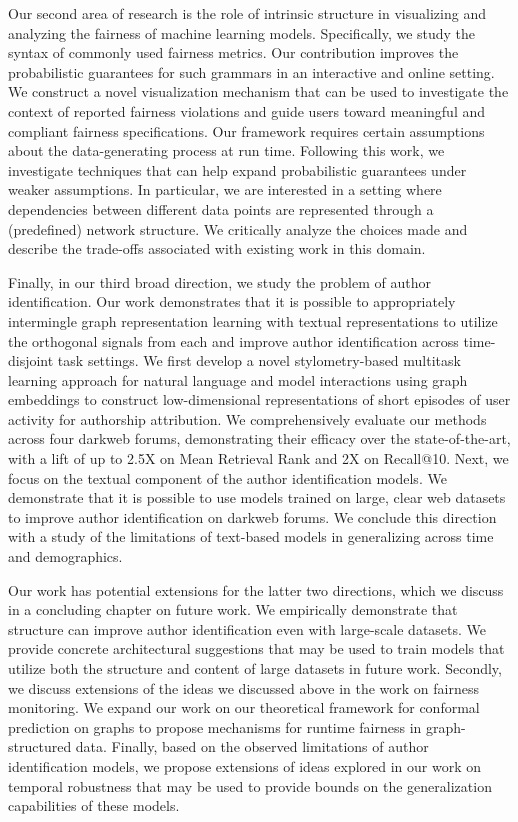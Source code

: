 Our second area of research is the role of intrinsic structure in visualizing and analyzing the fairness of machine learning models.
Specifically, we study the syntax of commonly used fairness metrics.
Our contribution improves the probabilistic guarantees for such grammars in an interactive and online setting.
We construct a novel visualization mechanism that can be used to investigate the context of reported fairness violations and guide users toward meaningful and compliant fairness specifications.
Our framework requires certain assumptions about the data-generating process at run time.
Following this work, we investigate techniques that can help expand probabilistic guarantees under weaker assumptions.
In particular, we are interested in a setting where dependencies between different data points are represented through a (predefined) network structure. We critically analyze the choices made and describe the trade-offs associated with existing work in this domain.

Finally, in our third broad direction, we study the problem of author identification.
Our work demonstrates that it is possible to appropriately intermingle graph representation learning with textual representations to utilize the orthogonal signals from each and improve author identification across time-disjoint task settings.
We first develop a novel stylometry-based multitask learning approach for natural language and model interactions using graph embeddings to construct low-dimensional representations of short episodes of user activity for authorship attribution. 
We comprehensively evaluate our methods across four darkweb forums, demonstrating their efficacy over the state-of-the-art, with a lift of up to 2.5X on Mean Retrieval Rank and 2X on Recall@10.
Next, we focus on the textual component of the author identification models.
We demonstrate that it is possible to use models trained on large, clear web datasets to improve author identification on darkweb forums.
We conclude this direction with a study of the limitations of text-based models in generalizing across time and demographics.

Our work has potential extensions for the latter two directions, which we discuss in a concluding chapter on future work.
We empirically demonstrate that structure can improve author identification even with large-scale datasets.
We provide concrete architectural suggestions that may be used to train models that utilize both the structure and content of large datasets in future work.
Secondly, we discuss extensions of the ideas we discussed above in the work on fairness monitoring.
We expand our work on our theoretical framework for conformal prediction on graphs to propose mechanisms for runtime fairness in graph-structured data.
Finally, based on the observed limitations of author identification models, we propose extensions of ideas explored in our work on temporal robustness that may be used to provide bounds on the generalization capabilities of these models.

\endinput